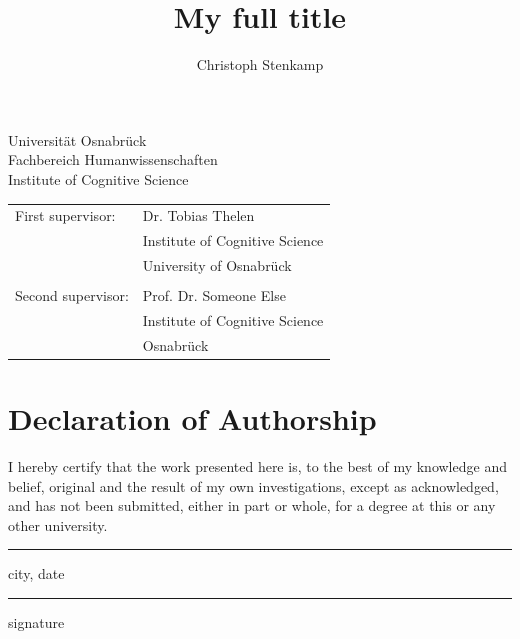 \documentclass[11pt,
  paper=a4, 
  bibliography=totocnumbered,
	captions=tableheading,
	BCOR=10mm
]{scrreprt}
\title{My full title}
\author{Christoph Stenkamp}
\theoremstyle{definition}
\newcommand{\namesigdate}[1][5cm]{%
	\vspace{5cm}
	{\setlength{\parindent}{0cm}
	\begin{minipage}{0.3\textwidth}
		\hrule 
		\vspace{0.5cm}
		{\small city, date}
	\end{minipage}
	 \hfill
	\begin{minipage}{0.3\textwidth}
		\hrule
		\vspace{0.5cm}
	    {\small signature}
	\end{minipage}
	}
}
\begin{document}
\begin{titlepage}
	\begin{flushleft}
		Universität Osnabrück\\
		Fachbereich Humanwissenschaften\\
		Institute of Cognitive Science
	\end{flushleft}

	\vspace{2cm}
	\vspace{1cm}

	\begin{tabular}{ll}
		First supervisor:  & Dr. Tobias Thelen          \\
		                   & Institute of Cognitive Science \\
		                   & University of Osnabrück  \\\\
		Second supervisor: & Prof. Dr. Someone Else         \\
		                   & Institute of Cognitive Science \\
		                   & Osnabrück
	\end{tabular}

\end{titlepage}


\chapter*{Declaration of Authorship}
I hereby certify that the work presented here is, to the best of my knowledge and belief, original and the result of my own investigations, except as acknowledged, and has not been submitted, either in part or whole, for a degree at this or any other university.

\namesigdate
{}
\pagebreak
\end{document}
